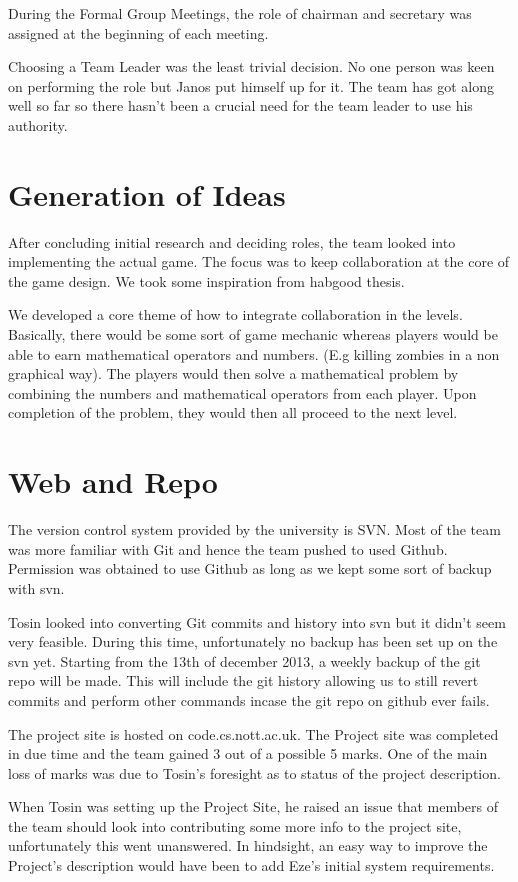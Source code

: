During the Formal Group Meetings, the role of chairman and 
secretary was assigned at the beginning of each meeting.

Choosing a Team Leader was the least trivial decision. No one 
person was keen on performing the role but Janos put himself 
up for it. The team has got along well so far so there hasn't 
been a crucial need for the team leader to use his authority.

\section{Generation of Ideas}
After concluding initial research and deciding roles, the team 
looked into implementing the actual game. The focus was to keep 
collaboration at the core of the game design. We took some 
inspiration from habgood thesis. 

We developed a core theme of how to integrate collaboration 
in the levels. Basically, there would be some sort of game 
mechanic whereas players would be able to earn mathematical 
operators and numbers. (E.g killing zombies in a non graphical 
way). The players would then solve a mathematical problem by 
combining the numbers and mathematical operators from each 
player. Upon completion of the problem, they would then all 
proceed to the next level.

\section{Web and Repo}
The version control system provided by the university is SVN. 
Most of the team was more familiar with Git and hence the team 
pushed to used Github. Permission was obtained to use Github 
as long as we kept some sort of backup with svn.

Tosin looked into converting Git commits and history into svn 
but it didn't seem very feasible. During this time, unfortunately 
no backup has been set up on the svn yet. Starting from the 
13th of december 2013, a weekly backup of the git repo will be 
made. This will include the git history allowing us to still 
revert commits and perform other commands incase the git repo 
on github ever fails.

The project site is hosted on code.cs.nott.ac.uk. The Project 
site was completed in due time and the team gained 3 out of a 
possible 5 marks. One of the main loss of marks was due to 
Tosin’s foresight as to status of the project description.

When Tosin was setting up the Project Site, he raised an issue 
that members of the team should look into contributing some 
more info to the project site, unfortunately this went unanswered. 
In hindsight, an easy way to improve the Project’s description 
would have been to add Eze’s initial system requirements.


